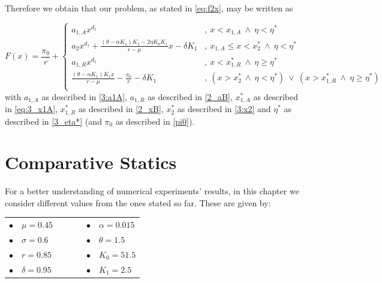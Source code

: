Therefore we obtain that our problem, as stated in \eqref{eq:f2x}, may be written as

\begin{equation}
F(x)=\frac{\pi_0}{r} + \begin{cases}
a_{1,A}x^{d_1}  &, \ x<x_{1,A} \  \wedge \ \eta<\eta^*\\
a_2x^{d_1}+\frac{(\theta-\alpha K_1)K_1-2 \eta K_0 K_1}{r-\mu} x - \delta K_1 &, \ x_{1,A} \leq x < x_2^* \ \wedge \ \eta<\eta^*\\
a_{1,R}x^{d_1} &, \ x<x_{1,R}^*  \ \wedge \ \eta\geq \eta^* \\
\frac{(\theta-\alpha K_1)K_1 x}{r-\mu} -\frac{\pi_0}{r} - \delta K_1   &, \ ( x>x_2^* \ \wedge \ \eta<\eta^*) \ \overset{.}{\vee} \ (x>x_{1,R}^* \ \wedge \ \eta \geq \eta^*) \\
\end{cases}
	\label{3_madzbigboy}
\end{equation}
with $a_{1,A}$ as described in \eqref{3:a1A}, $a_{1,R}$ as described in \eqref{2_aB}, $x^*_{1,A}$ as described in \eqref{eq:3_x1A}, $x^*_{1,R}$ as described in \eqref{2_xB}, $x^*_2$ as described in \eqref{3:x2} and $\eta^*$ as described in \eqref{3_eta*} (and $\pi_0$ as described in \eqref{pi0}).


\section{Comparative Statics}


For a better understanding of numerical experiments' results, in this chapter we consider different values from the ones stated so far. These are given by:
\begin{table}[!htb]
	\centering
	\begin{tabular}{lllllll}
		$\bullet$ & $\mu=0.45$     &  & \hspace{7cm} &  &  $\bullet$ & $\alpha=0.015$ \\
		$\bullet$ & $\sigma=0.6$ &  & \hspace{7cm} &  &  $\bullet$ & $\theta=1.5$   \\
		$\bullet$ & $r=0.85$       &  & \hspace{7cm} &  &  $\bullet$ & $K_0=51.5$       \\
		$\bullet$ & $\delta=0.95$     &  & \hspace{7cm} & &  $\bullet$ & $K_1=2.5$                              
	\end{tabular}
\end{table}


